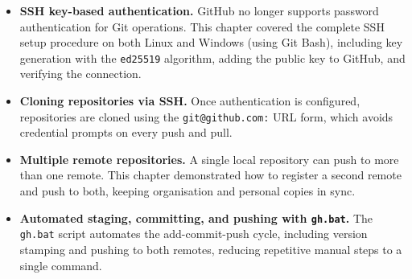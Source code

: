 \begin{itemize}
    \item \textbf{SSH key-based authentication.} GitHub no longer supports
    password authentication for Git operations. This chapter covered the
    complete SSH setup procedure on both Linux and Windows (using Git Bash),
    including key generation with the \texttt{ed25519} algorithm, adding
    the public key to GitHub, and verifying the connection.

    \item \textbf{Cloning repositories via SSH.} Once authentication is
    configured, repositories are cloned using the \texttt{git@github.com:}
    URL form, which avoids credential prompts on every push and pull.

    \item \textbf{Multiple remote repositories.} A single local repository
    can push to more than one remote. This chapter demonstrated how to
    register a second remote and push to both, keeping organisation and
    personal copies in sync.

    \item \textbf{Automated staging, committing, and pushing with
    \texttt{gh.bat}.} The \texttt{gh.bat} script automates the
    add-commit-push cycle, including version stamping and pushing to
    both remotes, reducing repetitive manual steps to a single command.
\end{itemize}

